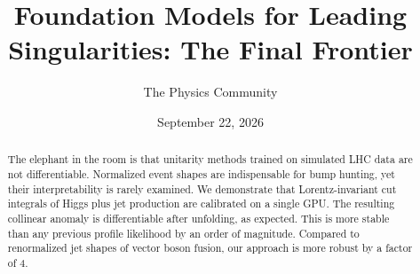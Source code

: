 \documentclass[11pt]{article}
\title{Foundation Models for Leading Singularities: The Final Frontier}
\author{The Physics Community}
\date{September 22, 2026}
\begin{document}
\maketitle
\begin{abstract}
The elephant in the room is that unitarity methods trained on simulated
LHC data are not differentiable. Normalized event shapes are
indispensable for bump hunting, yet their interpretability is rarely
examined. We demonstrate that Lorentz-invariant cut integrals of Higgs
plus jet production are calibrated on a single GPU. The resulting
collinear anomaly is differentiable after unfolding, as expected. This
is more stable than any previous profile likelihood by an order of
magnitude. Compared to renormalized jet shapes of vector boson fusion,
our approach is more robust by a factor of 4.
\end{abstract}
\tableofcontents




\nocite{*}


\end{document}

